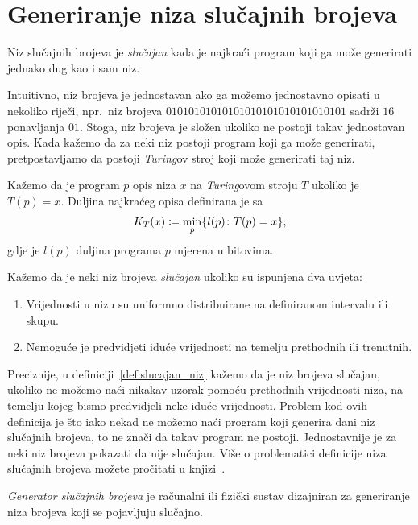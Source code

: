 \documentclass[10pt]{scrartcl}
\newcommand\foreign[1]{\textit{#1}}
\begin{document}
\section{Generiranje niza slučajnih brojeva}
\begin{definicija}
Niz slučajnih brojeva je \emph{slučajan} kada je najkraći program koji ga može generirati jednako dug kao i sam niz.
\end{definicija}
Intuitivno, niz brojeva je jednostavan ako ga možemo jednostavno opisati u nekoliko riječi, npr.\ niz brojeva $01010101010101010101010101010101$ sadrži $16$ ponavljanja $01$. Stoga, niz brojeva je složen ukoliko ne postoji takav jednostavan opis. Kada kažemo da za neki niz postoji program koji ga može generirati, pretpostavljamo da postoji \foreign{Turing}ov stroj koji može generirati taj niz.
\begin{definicija}
Kažemo da je program $p$ opis niza $x$ na \foreign{Turing}ovom stroju $T$ ukoliko je $T(p) = x$. Duljina najkraćeg opisa definirana je sa
\begin{equation}
    K_T(x) \coloneqq \min_p\{l(p) \colon T(p) = x \}\text,
\end{equation}
gdje je $l(p)$ duljina programa $p$ mjerena u bitovima.
\end{definicija}
\begin{definicija}\label{def:slucajan_niz}
Kažemo da je neki niz brojeva \emph{slučajan} ukoliko su ispunjena dva uvjeta:
\begin{enumerate}
    \item Vrijednosti u nizu su uniformno distribuirane na definiranom intervalu ili skupu.
    \item Nemoguće je predvidjeti iduće vrijednosti na temelju prethodnih ili trenutnih.
\end{enumerate}
\end{definicija}
Preciznije, u definiciji~\ref{def:slucajan_niz} kažemo da je niz brojeva slučajan, ukoliko ne možemo naći nikakav uzorak pomoću prethodnih vrijednosti niza, na temelju kojeg bismo predvidjeli neke iduće vrijednosti. Problem kod ovih definicija je što iako nekad ne možemo naći program koji generira dani niz slučajnih brojeva, to ne znači da takav program ne postoji. Jednostavnije je za neki niz brojeva pokazati da nije slučajan. Više o problematici definicije niza slučajnih brojeva možete pročitati u knjizi~\cite{book}.
\begin{definicija}
\emph{Generator  slučajnih  brojeva}  je  računalni  ili  fizički  sustav  dizajniran  za  generiranje  niza brojeva  koji  se  pojavljuju  slučajno. 
\end{definicija}
\end{document}
